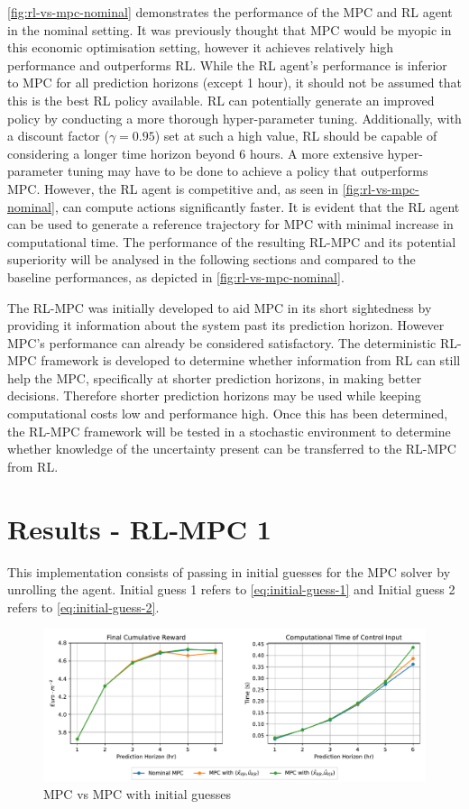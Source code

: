 \autoref{fig:rl-vs-mpc-nominal} demonstrates the performance of the MPC and RL agent in the nominal setting. It was previously thought that MPC would be myopic in this economic optimisation setting, however it achieves relatively high performance and outperforms RL. While the RL agent's performance is inferior to MPC for all prediction horizons (except 1 hour), it should not be assumed that this is the best RL policy available.  RL can potentially generate an improved policy by conducting a more thorough hyper-parameter tuning. Additionally, with a discount factor ($\gamma = 0.95$) set at such a high value, RL should be capable of considering a longer time horizon beyond 6 hours. A more extensive hyper-parameter tuning may have to be done to achieve a policy that outperforms MPC. However, the RL agent is competitive and, as seen in \autoref{fig:rl-vs-mpc-nominal}, can compute actions significantly faster. It is evident that the RL agent can be used to generate a reference trajectory for MPC with minimal increase in computational time. The performance of the resulting RL-MPC and its potential superiority will be analysed in the following sections and compared to the baseline performances, as depicted in \autoref{fig:rl-vs-mpc-nominal}. 

The RL-MPC was initially developed to aid MPC in its short sightedness by providing it information about the system past its prediction horizon. However MPC's performance can already be considered satisfactory. The deterministic RL-MPC framework is developed to determine whether information from RL can still help the MPC, specifically at shorter prediction horizons, in making better decisions. Therefore shorter prediction horizons may be used while keeping computational costs low and performance high. Once this has been determined, the RL-MPC framework will be tested in a stochastic environment to determine whether knowledge of the uncertainty present can be transferred to the RL-MPC from RL.

\section{Results - RL-MPC 1}
This implementation consists of passing in initial guesses for the MPC solver by unrolling the agent. Initial guess 1 refers to \autoref{eq:initial-guess-1} and Initial guess 2 refers to \autoref{eq:initial-guess-2}.
\begin{figure}[H]
	\centering
	\includegraphics[width=\textwidth]{figures/rl_mpc_impl_1.pdf}
	\caption{MPC vs MPC with initial guesses}
	\label{fig:rlmpc-impl1}
\end{figure}


